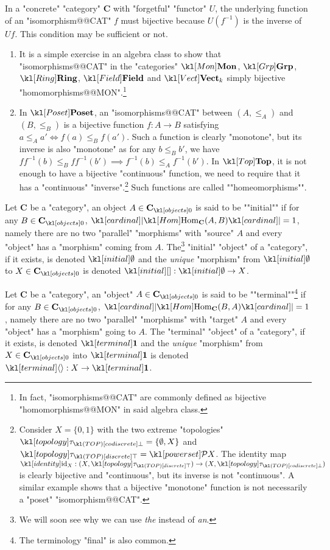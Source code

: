 \documentclass[main.tex]{subfiles}
\begin{document}
\begin{exmps}\label{exmps:isoconcrete}
	In a "concrete" "category" $\mathbf{C}$ with "forgetful" "functor" $U$, the underlying function of an "isomorphism@@CAT" $f$ must bijective because $U(f^{-1})$ is the inverse of $Uf$. This condition may be sufficient or not.
	\begin{enumerate}
		\item It is a simple exercise in an algebra class to show that "isomorphisms@@CAT" in the "categories" $\catMon$, $\catGrp$, $\catRing$, $\catField$ and $\catVect{k}$ simply bijective "homomorphisms@@MON".\footnote{In fact, "isomorphisms@@CAT" are commonly defined as bijective "homomorphisms@@MON" in said algebra class.}
		\item\label{exmp:isoposet} In $\catPoset$, an "isomorphisms@@CAT" between $(A,\leq_A)$ and $(B,\leq_B)$ is a bijective function $f: A \rightarrow B$ satisfying $a\leq_A a' \Leftrightarrow f(a) \leq_B f(a')$. Such a function is clearly "monotone", but its inverse is also "monotone" as for any $b\leq_B b'$, we have $ff^{-1}(b) \leq_B ff^{-1}(b') \implies f^{-1}(b) \leq_A f^{-1}(b')$.
		\itemAP In $\catTop$, it is not enough to have a bijective "continuous" function, we need to require that it has a "continuous" "inverse".\footnote{Consider $X = \{0,1\}$ with the two extreme "topologies" $\topo_{\codisc} = \{\emptyset,X\}$ and $\topo_{\disc} = \mP X$. The identity map $\id_X : (X, \topo_{\disc}) \rightarrow (X,\topo_{\codisc})$ is clearly bijective and "continuous", but its inverse is not "continuous". A similar example shows that a bijective "monotone" function is not necessarily a "poset" "isomorphism@@CAT".} Such functions are called ""homeomorphisms"".
	\end{enumerate}
\end{exmps}
\begin{defn}
	\AP Let $\mathbf{C}$ be a "category", an object $A \in \obj{\mathbf{C}}$ is said to be ""initial"" if for any $B \in \obj{\mathbf{C}}$, $\cardinal{\Hom_{\mathbf{C}}(A,B)} = 1$, namely there are no two "parallel" "morphisms" with "source" $A$ and every "object" has a "morphism" coming from $A$. The\footnote{We will soon see why we can use \textit{the} instead of \textit{an}.} "initial" "object" of a "category", if it exists, is denoted $\initial$ and the \textit{unique} "morphism" from $\initial$ to $X\in \obj{\mathbf{C}}$ is denoted $\initmorph: \initial \rightarrow X$.
\end{defn}
\begin{defn}
	\AP Let $\mathbf{C}$ be a "category", an "object" $A \in \obj{\mathbf{C}}$ is said to be ""terminal""\footnote{The terminology "final" is also common.} if for any $B \in \obj{\mathbf{C}}$, $\cardinal{\Hom_{\mathbf{C}}(B,A)} = 1$, namely there are no two "parallel" "morphisms" with "target" $A$ and every "object" has a "morphism" going to $A$. The "terminal" "object" of a "category", if it exists, is denoted $\terminal$ and the \textit{unique} "morphism" from $X \in \obj{\mathbf{C}}$ into $\terminal$ is denoted $\termmorph:X \rightarrow \terminal$.
\end{defn}
\end{document}
